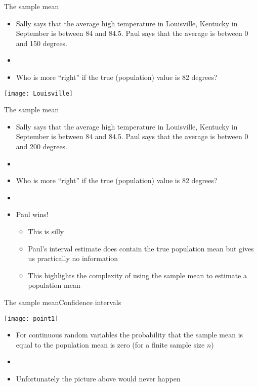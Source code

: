 \documentclass[xcolor=dvipsnames]{beamer}
\begin{document}
\begin{frame}{The sample mean}
	\begin{itemize}
		\item Sally says that the average high temperature in Louisville, Kentucky in September is between 84 and 84.5. Paul says that the average is between 0 and 150 degrees.
		\item[]
		\item Who is more ``right'' if the true (population) value is 82 degrees?
	\end{itemize}
	\begin{center}
		\texttt{[image: Louisville]}
	\end{center}
\end{frame}

\begin{frame}{The sample mean}
	\begin{itemize}
		\item Sally says that the average high temperature in Louisville, Kentucky in September is between 84 and 84.5. Paul says that the average is between 0 and 200 degrees.
		\item[]
		\item Who is more ``right'' if the true (population) value is 82 degrees?
		\item[]
		\item Paul wins! \pause
		\begin{itemize}
			\item This is silly
			\item Paul's interval estimate does contain the true population mean but gives us practically no information
			\item This highlights the complexity of using the sample mean to estimate a population mean
		\end{itemize}
	\end{itemize}
\end{frame}

\begin{frame}{The sample mean}{Confidence intervals}
	\begin{center}
		\texttt{[image: point1]}
	\end{center}
\begin{itemize}
	\item For continuous random variables the probability that the sample mean is equal to the population mean is zero (for a finite sample size $n$) \pause 
	\item[]
	\item Unfortunately the picture above would never happen
\end{itemize}
\end{frame}
\end{document}

